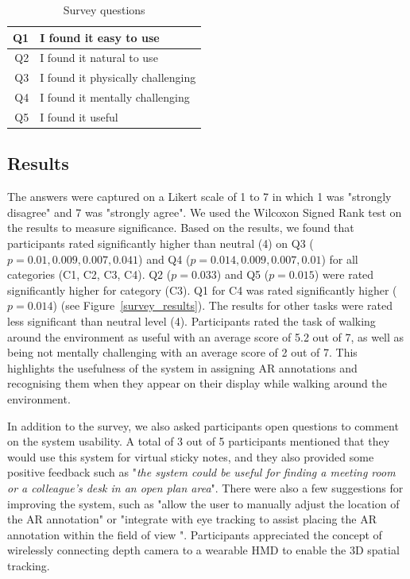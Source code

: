 \begin{table}[ht]
  \centering
	\caption{Survey questions}
    \label{table:questions}
    \begin{tabular}{r l}
    \hline
    Q1 & I found it easy to use \\ \hline
    Q2 & I found it natural to use \\ \hline
    Q3 & I found it physically challenging \\ \hline
    Q4 & I found it mentally challenging \\ \hline
    Q5 & I found it useful \\ \hline
    \end{tabular}
\end{table}

\subsection{Results}

The answers were captured on a Likert scale of 1 to 7 in which 1 was "strongly disagree" and 7 was "strongly agree". We used the Wilcoxon Signed Rank test on the results to measure significance. Based on the results, we found that participants rated significantly higher than neutral (4) on Q3 ($p=0.01, 0.009, 0.007, 0.041$) and Q4 ($p=0.014, 0.009, 0.007, 0.01$) for all categories (C1, C2, C3, C4). Q2 ($p=0.033$) and Q5 ($p=0.015$) were rated significantly higher for category (C3). Q1 for C4 was rated significantly higher ($p=0.014$) (see Figure~\ref{survey_results}). The results  for other tasks were rated less significant than neutral level (4). Participants rated the task of walking around the environment as useful with an average score of 5.2 out of 7, as well as being not mentally challenging with an average score of 2 out of 7. This highlights the usefulness of the system in assigning AR annotations and recognising them when they appear on their display while walking around the environment. 

In addition to the survey, we also asked participants open questions to comment on the system usability. A total of 3 out of 5 participants mentioned that they would use this system for virtual sticky notes, and they also provided some positive feedback such as "\textit{the system could be useful for finding a meeting room or a colleague's desk in an open plan area}". There were also a few suggestions for improving the system, such as "allow the user to manually adjust the location of the AR annotation" or "integrate with eye tracking to assist placing the AR annotation within the field of view ". Participants appreciated  the concept of wirelessly connecting depth camera to a wearable HMD to enable the 3D spatial tracking.    


